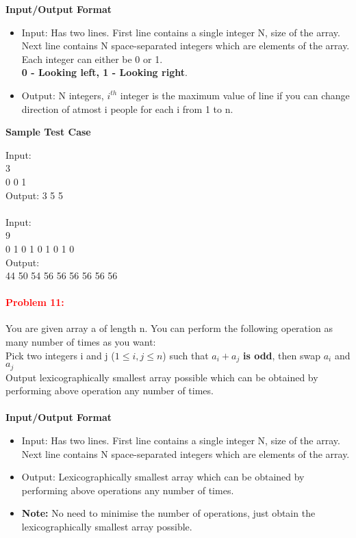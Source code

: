 \documentclass[a4paper,11pt]{article} %
\begin{document}
\textbf{Input/Output Format}
\begin{itemize}
    \item  Input: Has two lines. First line contains a single integer N, size of the array. Next line contains N space-separated integers which are elements of the array. Each integer can either be 0 or 1.\\ \textbf{0 - Looking left, 1 - Looking right}.
    \item  Output: N integers, $i^{th}$ integer is the maximum value of line if you can change direction of atmost i people for each i from 1 to n.
\end{itemize}

\textbf{Sample Test Case}

Input: \\
3\\
0 0 1\\
Output: 3 5 5\\
\\
Input: \\
9\\
0 1 0 1 0 1 0 1 0\\
Output:\\
44 50 54 56 56 56 56 56 56\\


\vspace*{0.3cm}

\paragraph{\textcolor{red}{Problem 11: }}
You are given array a of length n. You can perform the following operation as many number of times as you want:\\
Pick two integers i and j ($1 \leq i,j \leq n$) such that $a_i + a_j$ \textbf{is odd}, then swap $a_i$ and $a_j$\\
Output lexicographically  smallest array possible which can be obtained by performing above operation any number of times.\\
\\

\textbf{Input/Output Format}
\begin{itemize}
    \item  Input: Has two lines. First line contains a single integer N, size of the array. Next line contains N space-separated integers which are elements of the array.
    \item  Output: Lexicographically smallest array which can be obtained by performing above operations any number of times.
    \item \textbf{Note: } No need to minimise the number of operations, just  obtain the lexicographically smallest array possible.
\end{itemize}
\end{document}
